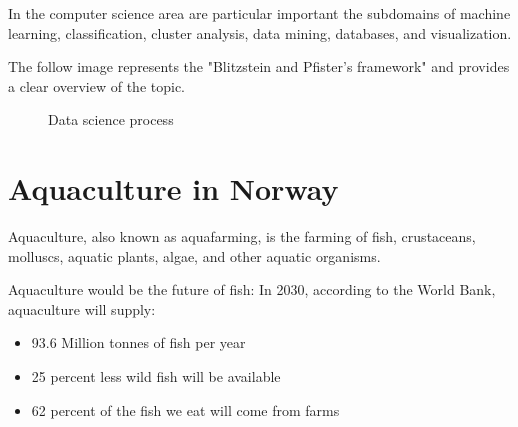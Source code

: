 In the computer science area are particular important the subdomains of machine learning, classification, cluster analysis, data mining, databases, and visualization.

The follow image represents the "Blitzstein and Pfister's framework" and provides a clear overview of the topic.

\begin{figure}[H]
    \centering
    \caption[Data science process]{Data science process}
    \label{fig: Data_science}
\end{figure}



\newpage

\section{Aquaculture in Norway}
Aquaculture, also known as aquafarming, is the farming of fish, crustaceans, molluscs, aquatic plants, algae, and other aquatic organisms.

Aquaculture would be the future of fish:
In 2030, according to the World Bank, aquaculture will supply:
\begin{itemize}
\item 93.6 Million tonnes of fish per year
\item 25 percent less wild fish will be available
\item 62 percent of the fish we eat will come from farms
\end{itemize}

